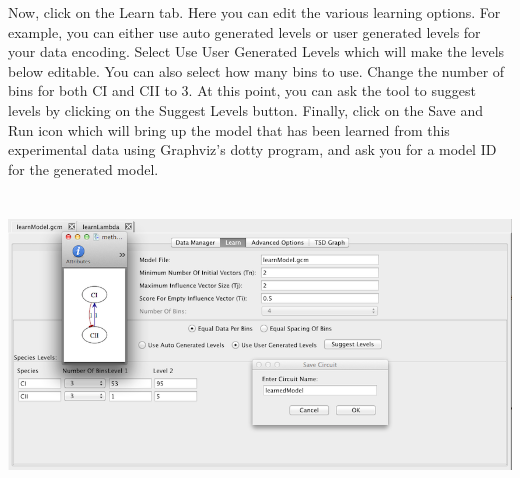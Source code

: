 \documentclass[titlepage,11pt]{article}
\begin{document}
Now, click on the Learn tab.  Here you can edit the various learning options.  For example, you can either use auto generated levels or user generated levels for your data encoding.  Select Use User Generated Levels which will make the levels below editable.  You can also select how many bins to use.  Change the number of bins for both CI and CII to 3.  At this point, you can ask the tool to suggest levels by clicking on the Suggest Levels button.  Finally, click on the Save and Run icon which will bring up the model that has been learned from this experimental data
using Graphviz's dotty program, and ask you for a model ID for the generated model.  

\begin{center}
\includegraphics[height=80mm]{screenshots/learn}
\end{center}
\end{document}
